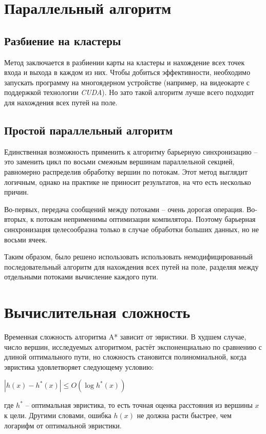 \section{Параллельный алгоритм}

\subsection{Разбиение на кластеры}
Метод заключается в разбиении карты на кластеры и нахождение всех
точек входа и выхода в каждом из них. Чтобы добиться эффективности, необходимо
запускать программу на многоядерном устройстве (например, на видеокарте
с поддержкой технологии \textit{CUDA}). Но зато такой алгоритм лучше
всего подходит для нахождения всех путей на поле.

\subsection{Простой параллельный алгоритм}
Единственная возможность применить к алгоритму барьерную синхронизацию
-- это заменить цикл по восьми смежным вершинам параллельной секцией,
равномерно распределив обработку вершин по потокам. Этот метод выглядит логичным, однако
на практике не приносит результатов, на что есть несколько причин.

Во-первых, передача сообщений между потоками -- очень дорогая операция.
Во-вторых, к потокам неприменимы оптимизации компилятора. Поэтому барьерная
синхронизация целесообразна только в случае обработки больших данных,
но не восьми ячеек.

Таким образом, было решено использовать использовать немодифицированный
последовательный алгоритм для нахождения всех путей на поле, разделяя между
отдельными потоками вычисление каждого пути.

\section{Вычислительная сложность}

Временная сложность алгоритма A* зависит от эвристики. В худшем
случае, число вершин, исследуемых алгоритмом, растёт экспоненциально
по сравнению с длиной оптимального пути, но сложность становится
полиномиальной, когда эвристика удовлетворяет следующему условию:

\begin{center}
$|h(x)−h^*(x)| \leq O(\log h^*(x))$
\end{center}

где $h^*$ -- оптимальная эвристика,
то есть точная оценка расстояния из вершины $x$ к цели. Другими словами,
ошибка $h(x)$ не должна расти быстрее, чем логарифм от оптимальной
эвристики.


